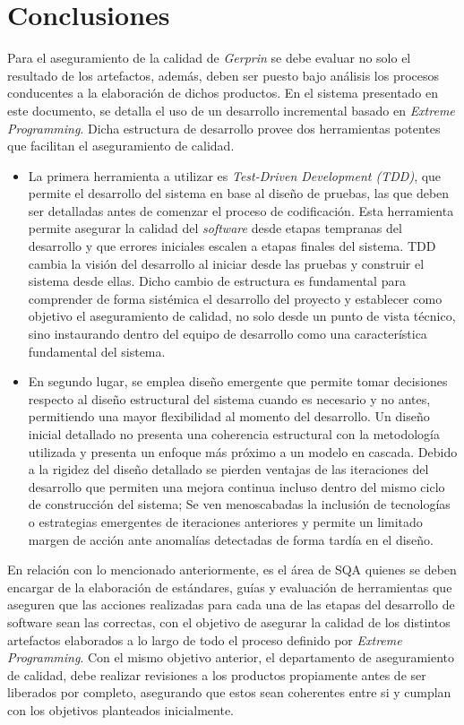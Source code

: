 \chapter{Conclusiones }
Para el aseguramiento de la calidad de \textit{Gerprin} se debe evaluar no solo el resultado de los artefactos, además, deben ser puesto bajo análisis los procesos conducentes a la elaboración de dichos productos. 
En el sistema presentado en este documento, se detalla el uso de un desarrollo incremental basado en \textit{Extreme Programming}. Dicha estructura de desarrollo provee dos herramientas potentes que facilitan el aseguramiento de calidad.\begin{itemize}
\item
La primera herramienta a utilizar es \textit{Test-Driven Development (TDD)}, que permite el desarrollo del sistema en base al diseño de pruebas, las que deben  ser detalladas antes de comenzar el proceso de codificación. Esta herramienta permite asegurar la calidad del \textit{software} desde etapas tempranas del desarrollo y que errores iniciales escalen a etapas finales del sistema. 
TDD cambia la visión del desarrollo al iniciar desde las pruebas y construir el sistema desde ellas. Dicho cambio de estructura es fundamental para comprender de forma sistémica el desarrollo del proyecto y establecer como objetivo el aseguramiento de calidad, no solo desde un punto de vista técnico, sino instaurando dentro del equipo de desarrollo como una característica fundamental del sistema.
\item
En segundo lugar, se emplea diseño emergente que permite tomar decisiones respecto al diseño estructural del sistema cuando es necesario y no antes, permitiendo una mayor flexibilidad al momento del desarrollo.
Un diseño inicial detallado no presenta una coherencia estructural con la metodología utilizada y presenta un enfoque más próximo a un modelo en cascada. Debido a la rigidez del diseño detallado se pierden ventajas de las iteraciones del desarrollo que permiten una mejora continua incluso dentro del mismo ciclo de construcción del sistema; Se ven menoscabadas la inclusión de tecnologías o estrategias emergentes de iteraciones anteriores y permite un limitado margen de acción ante anomalías detectadas de forma tardía en el diseño. 
\end{itemize}
En relación con lo mencionado anteriormente, es el área de SQA quienes se deben encargar de la elaboración de estándares, guías y evaluación de herramientas que aseguren que las acciones realizadas para cada una de las etapas del desarrollo de software sean las correctas, con el objetivo de asegurar la calidad de los distintos artefactos elaborados a lo largo de todo el proceso definido por \textit{Extreme Programming}. Con el mismo objetivo anterior, el departamento de aseguramiento de calidad, debe realizar revisiones a los productos propiamente antes de ser liberados por completo, asegurando que estos sean coherentes entre si y cumplan con los objetivos planteados inicialmente. 
